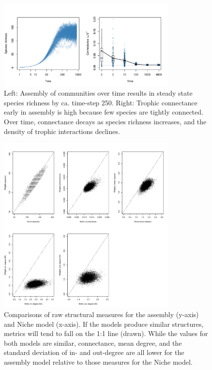 \documentclass[twocolumn,preprintnumbers,amsmath,amssymb,superscriptaddress,linenumbers]{revtex4-1}
\begin{document}
\begin{figure}[h!]
\centering
\includegraphics[width=0.8\textwidth]{fig_conn.pdf}
\caption{
Left: Assembly of communities over time results in steady state species richness by ca. time-step 250.
Right: Trophic connectance early in assembly is high because few species are tightly connected.
Over time, connectance decays as species richness increases, and the density of trophic interactions declines.
}
\label{fig:conn}
\end{figure}



\begin{figure}[h!]
\centering
\includegraphics[width=0.8\textwidth]{fig_errorscatter.pdf}
\caption{
Comparisons of raw structural measures for the assembly (y-axis) and Niche model (x-axis).
If the models produce similar structures, metrics will tend to fall on the 1:1 line (drawn).
While the values for both models are similar, connectance, mean degree, and the standard deviation of in- and out-degree are all lower for the assembly model relative to those measures for the Niche model.
}
\label{fig:error1}
\end{figure}
\end{document}
